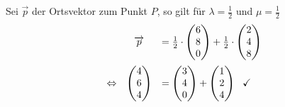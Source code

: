 Sei $\displaystyle \vec{p}$ der Ortsvektor zum Punkt $\displaystyle P$, so gilt für $\displaystyle \lambda =\frac{1}{2}$ und $\displaystyle \mu =\frac{1}{2}$ 
\begin{equation*}
	\begin{array}{ c c l }
		& \vec{p} & =\frac{1}{2} \cdotp \begin{pmatrix}
			6\\
			8\\
			0
		\end{pmatrix} +\frac{1}{2} \cdotp \begin{pmatrix}
			2\\
			4\\
			8
		\end{pmatrix}\vspace{2mm}\\
		\Leftrightarrow  & \begin{pmatrix}
			4\\
			6\\
			4
		\end{pmatrix} & =\begin{pmatrix}
			3\\
			4\\
			0
		\end{pmatrix} +\begin{pmatrix}
			1\\
			2\\
			4
		\end{pmatrix} \ \ \checkmark
	\end{array}
\end{equation*}

